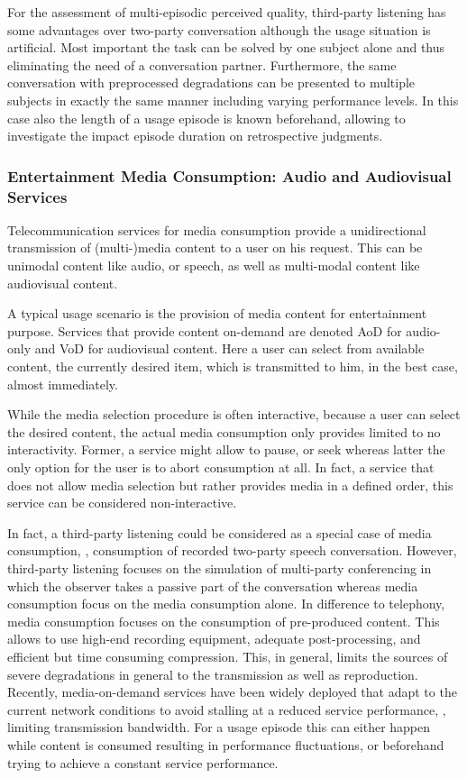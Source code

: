 For the assessment of multi-episodic perceived quality, third-party listening has some advantages over two-party conversation although the usage situation is artificial.
Most important the task can be solved by one subject alone and thus eliminating the need of a conversation partner.
Furthermore, the same conversation with preprocessed degradations can be presented to multiple subjects in exactly the same manner including varying performance levels.
In this case also the length of a usage episode is known beforehand, allowing to investigate the impact episode duration on retrospective judgments.

\subsubsection{Entertainment Media Consumption: Audio and Audiovisual Services}
Telecommunication services for media consumption provide a unidirectional transmission of (multi-)media content to a user on his request.
This can be unimodal content like audio, or speech, as well as multi-modal content like audiovisual content.

A typical usage scenario is the provision of media content for entertainment purpose.
Services that provide content on-demand are denoted \ac{AoD} for audio-only and \ac{VoD} for audiovisual content.
Here a user can select from available content, the currently desired item, which is transmitted to him, in the best case, almost immediately.

While the media selection procedure is often interactive, because a user can select the desired content, the actual media consumption only provides limited to no interactivity.
Former, a service might allow to pause, or seek whereas latter the only option for the user is to abort consumption at all.
In fact, a service that does not allow media selection but rather provides media in a defined order, this service can be considered non-interactive.

In fact, a third-party listening could be considered as a special case of media consumption, \ie, consumption of recorded two-party speech conversation.
However, third-party listening focuses on the simulation of multi-party conferencing in which the observer takes a passive part of the conversation whereas media consumption focus on the media consumption alone.
In difference to telephony, media consumption focuses on the consumption of pre-produced content.
This allows to use high-end recording equipment, adequate post-processing, and efficient but time consuming compression.
This, in general, limits the sources of severe degradations in general to the transmission as well as reproduction.
Recently, media-on-demand services have been widely deployed that adapt to the current network conditions to avoid stalling at a reduced service performance, \eg, limiting transmission bandwidth.
For a usage episode this can either happen while content is consumed resulting in performance fluctuations, or beforehand trying to achieve a constant service performance.


